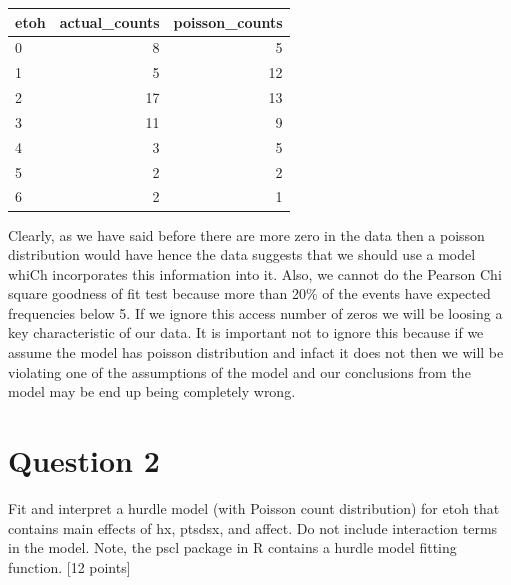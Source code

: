 \documentclass{article}\usepackage[]{graphicx}\usepackage[]{color}
\newenvironment{knitrout}{}{} %
\begin{document}
\begin{knitrout}
\color{fgcolor}
\begin{tabular}{l|r|r}
\hline
etoh & actual\_counts & poisson\_counts\\
\hline
0 & 8 & 5\\
\hline
1 & 5 & 12\\
\hline
2 & 17 & 13\\
\hline
3 & 11 & 9\\
\hline
4 & 3 & 5\\
\hline
5 & 2 & 2\\
\hline
6 & 2 & 1\\
\hline
\end{tabular}


\end{knitrout}


\vspace{5mm}

Clearly, as we have said before there are more zero in the data then a poisson distribution would have hence the data suggests that we should use a model whiCh incorporates this information into it. Also, we cannot do the Pearson Chi square goodness of fit test because more than 20\% of the events have expected frequencies below 5. If we ignore this access number of zeros we will be loosing a key characteristic of our data. It is important not to ignore this because if we assume the model has poisson distribution and infact it does not then we will be violating one of the assumptions of the model and our conclusions from the model may be end up being completely wrong.  


\vspace{5mm}







\section*{Question 2}

Fit and interpret a hurdle model (with Poisson count distribution) for etoh that contains main effects of hx, ptsdsx, and affect. Do not include interaction terms in the model. Note, the pscl package in R contains a hurdle model fitting function. [12 points]

\vspace{5mm}
\end{document}
